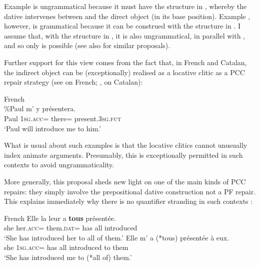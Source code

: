 \documentclass[output=paper,colorlinks,citecolor=brown,nonflat]{./langscibook}
\begin{document}
Example  is ungrammatical because it must have the structure in , whereby the dative intervenes between \liv and the direct object (in its base position). Example , however, is grammatical because it can be construed with the structure in . I assume that, with the structure in , it is also ungrammatical, in parallel with , and so only  is possible (see also \citealt{Anagnostopoulou2003, Rezac2008} for similar proposals). 

Further support for this view comes from the fact that, in French and Catalan, the indirect object can be (exceptionally) realised as a locative clitic as a PCC repair strategy (see \citealt{Postal1990, Rezac2008} on French; \citealt{Bonet1991}, \citeyear{Bonet2007} on Catalan):

\ea%
    \label{ex:sheehan:42}
    French\\
    \gll  \%Paul   m’       y       présentera.\\
            Paul   \textsc{1sg}.\textsc{acc}=   there\textsc{=}   present.\textsc{3sg.fut}\\
    \glt   ‘Paul will introduce me to him.’
\z

What is usual about such examples is that the locative clitics cannot unusually index animate arguments. Presumably, this is exceptionally permitted in such contexts to avoid ungrammaticality.

More generally, this proposal sheds new light on one of the main kinds of PCC repairs: they simply involve the prepositional dative construction not a PF repair. This explains immediately why there is no quantifier stranding in such contexts \citep{Kayne1975, Rezac2008}:

\ea%
    \label{ex:sheehan:43}
    French \citep[98]{Rezac2008}
    \ea\label{ex:sheehan:43a}
    \gll    Elle   la   leur   a   \textbf{tous}   présentée.\\
            she   her.\textsc{acc}=  them.\textsc{dat}=   has   all   introduced\\
    \glt   ‘She has introduced her to all of them.’ 
    \ex\label{ex:sheehan:43b}
    \gll    Elle m'   a   (*tous)   présentée     à   eux.\\
          she \textsc{1sg}.\textsc{acc}= has   all     introduced  to   them\\
    \glt     ‘She has introduced me to (*all of) them.’
    \z
\z
\end{document}
